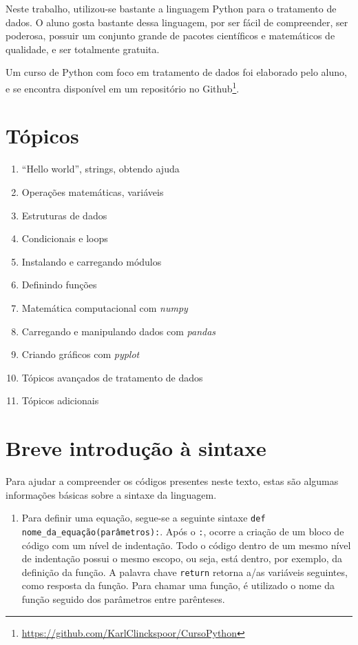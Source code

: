 \begin{apendicesenv}
Neste trabalho, utilizou-se bastante a linguagem Python para o tratamento de dados. O aluno gosta bastante dessa linguagem, por ser fácil de compreender, ser poderosa, possuir um conjunto grande de pacotes científicos e matemáticos de qualidade, e ser totalmente gratuita. 

Um curso de Python com foco em tratamento de dados foi elaborado pelo aluno, e se encontra disponível em um repositório no Github\footnote{\href{https://github.com/KarlClinckspoor/CursoPython}{https://github.com/KarlClinckspoor/CursoPython}}. 

\section{Tópicos}

	\begin{enumerate}[noitemsep]
		\item ``Hello world'', strings, obtendo ajuda
		\item Operações matemáticas, variáveis
		\item Estruturas de dados
		\item Condicionais e loops
		\item Instalando e carregando módulos
		\item Definindo funções
		\item Matemática computacional com \emph{numpy}
		\item Carregando e manipulando dados com \emph{pandas}
		\item Criando gráficos com \emph{pyplot}
		\item Tópicos avançados de tratamento de dados
		\item Tópicos adicionais
	\end{enumerate}

\section{Breve introdução à sintaxe}

Para ajudar a compreender os códigos presentes neste texto, estas são algumas informações básicas sobre a sintaxe da linguagem.

\begin{enumerate}
	\item 	Para definir uma equação, segue-se a seguinte sintaxe \texttt{def nome_da_equação(parâmetros):}. Após o \texttt{:}, ocorre a criação de um bloco de código com um nível de indentação. Todo o código dentro de um mesmo nível de indentação possui o mesmo escopo, ou seja, está dentro, por exemplo, da definição da função. A palavra chave \texttt{return} retorna a/as variáveis seguintes, como resposta da função. Para chamar uma função, é utilizado o nome da função seguido dos parâmetros entre parênteses.
	

\end{enumerate}
\end{apendicesenv}
